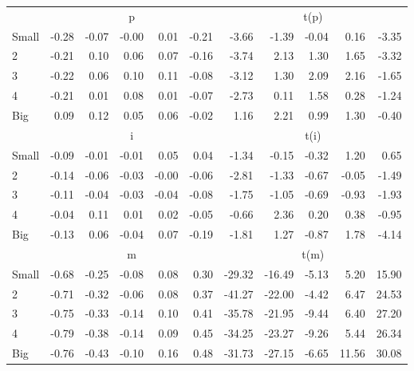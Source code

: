 \begin{table}[!ht]
\begin{tabular}{lrrrrrrrrrr}
  
     & \multicolumn{5}{c}{p} & \multicolumn{5}{c}{t(p)}   \\
     \cmidrule(r){2-6} \cmidrule(r){7-11} 
    Small  & -0.28  & -0.07  & -0.00  & 0.01  & -0.21  & -3.66  & -1.39  & -0.04  & 0.16  & -3.35   \\
    2  & -0.21  & 0.10  & 0.06  & 0.07  & -0.16  & -3.74  & 2.13  & 1.30  & 1.65  & -3.32   \\
    3  & -0.22  & 0.06  & 0.10  & 0.11  & -0.08  & -3.12  & 1.30  & 2.09  & 2.16  & -1.65   \\
    4  & -0.21  & 0.01  & 0.08  & 0.01  & -0.07  & -2.73  & 0.11  & 1.58  & 0.28  & -1.24   \\
    Big  & 0.09  & 0.12  & 0.05  & 0.06  & -0.02  & 1.16  & 2.21  & 0.99  & 1.30  & -0.40   \\
    
  
     & \multicolumn{5}{c}{i} & \multicolumn{5}{c}{t(i)}   \\
     \cmidrule(r){2-6} \cmidrule(r){7-11} 
    Small  & -0.09  & -0.01  & -0.01  & 0.05  & 0.04  & -1.34  & -0.15  & -0.32  & 1.20  & 0.65   \\
    2  & -0.14  & -0.06  & -0.03  & -0.00  & -0.06  & -2.81  & -1.33  & -0.67  & -0.05  & -1.49   \\
    3  & -0.11  & -0.04  & -0.03  & -0.04  & -0.08  & -1.75  & -1.05  & -0.69  & -0.93  & -1.93   \\
    4  & -0.04  & 0.11  & 0.01  & 0.02  & -0.05  & -0.66  & 2.36  & 0.20  & 0.38  & -0.95   \\
    Big  & -0.13  & 0.06  & -0.04  & 0.07  & -0.19  & -1.81  & 1.27  & -0.87  & 1.78  & -4.14   \\
    
  
     & \multicolumn{5}{c}{m} & \multicolumn{5}{c}{t(m)}   \\
     \cmidrule(r){2-6} \cmidrule(r){7-11} 
    Small  & -0.68  & -0.25  & -0.08  & 0.08  & 0.30  & -29.32  & -16.49  & -5.13  & 5.20  & 15.90   \\
    2  & -0.71  & -0.32  & -0.06  & 0.08  & 0.37  & -41.27  & -22.00  & -4.42  & 6.47  & 24.53   \\
    3  & -0.75  & -0.33  & -0.14  & 0.10  & 0.41  & -35.78  & -21.95  & -9.44  & 6.40  & 27.20   \\
    4  & -0.79  & -0.38  & -0.14  & 0.09  & 0.45  & -34.25  & -23.27  & -9.26  & 5.44  & 26.34   \\
    Big  & -0.76  & -0.43  & -0.10  & 0.16  & 0.48  & -31.73  & -27.15  & -6.65  & 11.56  & 30.08   \\
  
  \bottomrule
\end{tabular}
\label{tbl:Size_Prior}
\end{table}
